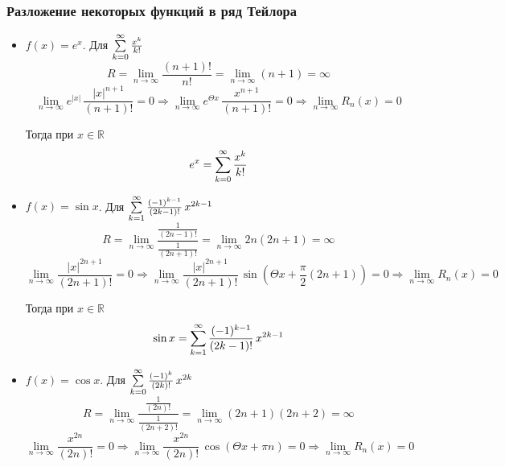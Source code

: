 \subsubsection{Разложение некоторых функций в ряд Тейлора}
\begin{itemize}
	\item $f(x) = e^x$.
	Для $\series[0] \frac{x^k}{k!}$
	\begin{equation*}
	R = \lim_{n \to \infty} \frac{(n + 1)!}{n!} =
	\lim_{n \to \infty} (n + 1) = \infty
	\end{equation*}
	\begin{equation*}
	\lim_{n \to \infty} e^{|x|}\,\frac{|x|^{n+1}}{(n + 1)!} = 0 \Rightarrow
	\lim_{n \to \infty} e^{\Theta x}\,\frac{x^{n+1}}{(n + 1)!} = 0 \Rightarrow
	\lim_{n \to \infty} R_n(x) = 0
	\end{equation*}
	
	Тогда при $x \in \mathbb R$
	\begin{equation*}
	e^x = \series[0] \frac{x^k}{k!}
	\end{equation*}
	
	\item $f(x) = \sin x$.
	Для $\series \frac{(-1)^{k-1}}{(2k - 1)!}\,x^{2k-1}$
	\begin{equation*}
	R = \lim_{n \to \infty} \frac
	{\frac1{(2n - 1)!}}
	{\frac1{(2n + 1)!}} =
	\lim_{n \to \infty} 2n (2n + 1) = \infty
	\end{equation*}
	\begin{equation*}
	\lim_{n \to \infty} \frac{|x|^{2n+1}}{(2n + 1)!} = 0 \Rightarrow
	\lim_{n \to \infty} \frac{|x|^{2n+1}}{(2n + 1)!}\,\sin \left( \Theta x + \frac\pi2 (2n + 1) \right) = 0 \Rightarrow
	\lim_{n \to \infty} R_n(x) = 0
	\end{equation*}
	
	Тогда при $x \in \mathbb R$
	\begin{equation*}
	\sin x = \series \frac{(-1)^{k-1}}{(2k - 1)!}\,x^{2k-1}
	\end{equation*}
	
	\item $f(x) = \cos x$.
	Для $\series[0] \frac{(-1)^k}{(2k)!}\,x^{2k}$
	\begin{equation*}
	R = \lim_{n \to \infty} \frac
	{\frac1{(2n)!}}
	{\frac1{(2n + 2)!}} =
	\lim_{n \to \infty} (2n + 1) (2n + 2) = \infty
	\end{equation*}
	\begin{equation*}
	\lim_{n \to \infty} \frac{x^{2n}}{(2n)!} = 0 \Rightarrow
	\lim_{n \to \infty} \frac{x^{2n}}{(2n)!}\,\cos \left( \Theta x + \pi n \right) = 0 \Rightarrow
	\lim_{n \to \infty} R_n(x) = 0
	\end{equation*}
	

\end{itemize}
